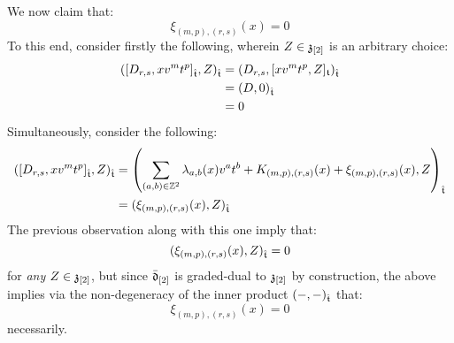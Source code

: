 \begin{remark}
\begin{itemize}
                    We now claim that:
                        $$\xi_{(m, p), (r, s)}(x) = 0$$
                    To this end, consider firstly the following, wherein $Z \in \mathfrak{z}_{[2]}$ is an arbitrary choice:
                        $$
                            \begin{aligned}
                                ( [D_{r, s}, x v^m t^p]_{\hat{\mathfrak{t}}}, Z )_{\hat{\mathfrak{t}}} & = ( D_{r, s}, [x v^m t^p, Z]_{\mathfrak{t}} )_{\hat{\mathfrak{t}}}
                                \\
                                & = (D, 0)_{\hat{\mathfrak{t}}}
                                \\
                                & = 0
                            \end{aligned}
                        $$
                    Simultaneously, consider the following:
                        $$
                            \begin{aligned}
                                ( [D_{r, s}, x v^m t^p]_{\hat{\mathfrak{t}}}, Z )_{\hat{\mathfrak{t}}} & = \left( \sum_{(a, b) \in \mathbb{Z}^2} \lambda_{a, b}(x) v^a t^b + K_{(m, p), (r, s)}(x) + \xi_{(m, p), (r, s)}(x), Z \right)_{\hat{\mathfrak{t}}}
                                \\
                                & = ( \xi_{(m, p), (r, s)}(x), Z )_{\hat{\mathfrak{t}}}
                            \end{aligned}
                        $$
                    The previous observation along with this one imply that:
                        $$( \xi_{(m, p), (r, s)}(x), Z )_{\hat{\mathfrak{t}}} = 0$$
                    for \textit{any} $Z \in \mathfrak{z}_{[2]}$, but since $\bar{\mathfrak{d}}_{[2]}$ is graded-dual to $\mathfrak{z}_{[2]}$ by construction, the above implies via the non-degeneracy of the inner product $(-, -)_{\hat{\mathfrak{t}}}$ that:
                        $$\xi_{(m, p), (r, s)}(x) = 0$$
                    necessarily. 


\end{itemize}
\end{remark}

